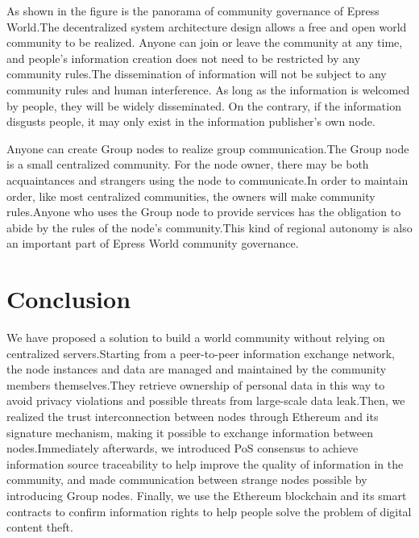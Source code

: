 \documentclass{article}
\begin{document}
    As shown in the figure is the panorama of community governance of Epress World.The decentralized system architecture design allows a free and open world community to be realized. Anyone can join or leave the community at any time, and people's information creation does not need to be restricted by any community rules.The dissemination of information will not be subject to any community rules and human interference. As long as the information is welcomed by people, they will be widely disseminated. On the contrary, if the information disgusts people, it may only exist in the information publisher's own node.
    
    Anyone can create Group nodes to realize group communication.The Group node is a small centralized community. For the node owner, there may be both acquaintances and strangers using the node to communicate.In order to maintain order, like most centralized communities, the owners will make community rules.Anyone who uses the Group node to provide services has the obligation to abide by the rules of the node's community.This kind of regional autonomy is also an important part of Epress World community governance.
\section{Conclusion}
    We have proposed a solution to build a world community without relying on centralized servers.Starting from a peer-to-peer information exchange network, the node instances and data are managed and maintained by the community members themselves.They retrieve ownership of personal data in this way to avoid privacy violations and possible threats from large-scale data leak.Then, we realized the trust interconnection between nodes through Ethereum and its signature mechanism, making it possible to exchange information between nodes.Immediately afterwards, we introduced PoS consensus to achieve information source traceability to help improve the quality of information in the community, and made communication between strange nodes possible by introducing Group nodes. Finally, we use the Ethereum blockchain and its smart contracts to confirm information rights to help people solve the problem of digital content theft.
\end{document}
